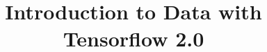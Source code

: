 \documentclass[xcolor=dvipsnames,compress,t,pdf,9pt]{beamer}
\title[\insertframenumber /\inserttotalframenumber]{Introduction to Data with Tensorflow 2.0}
\begin{document}
	\begin{frame}
	\titlepage
	\end{frame}

	
	
\end{document}
